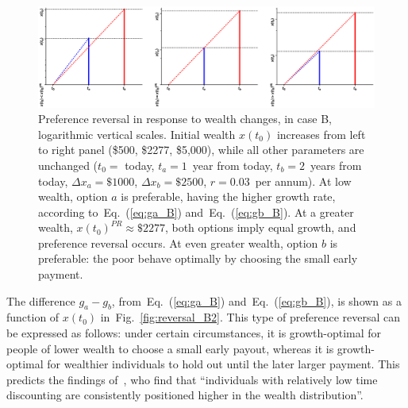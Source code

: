 \documentclass[11pt]{article}
\newcommand{\eref}[1]{Eq.~(\ref{eq:#1})}
\newcommand{\flabel}[1]{\label{fig:#1}}
\newcommand{\fref}[1]{Fig.~\ref{fig:#1}}
\newcommand{\Dx}{\Delta x}
\numberwithin{equation}{section}
\begin{document}
\begin{figure}[!htb]
\centering
\includegraphics[width=1.0\textwidth]{./figures/reversals_B.eps}
\caption{Preference reversal in response to wealth changes, in case B, logarithmic vertical scales. Initial wealth $x(t_0)$ increases from left to right panel (\$500, \$2277, \$5,000), while all other parameters are unchanged ($t_0=$ today, $t_a=1$~year from today, $t_b=2$~years from today, $\Dx_a=\$1000$, $\Dx_b=\$2500$, $r=0.03$~per annum). At low wealth, option $a$ is preferable, having the higher growth rate, according to~\eref{ga_B} and~\eref{gb_B}. At a greater wealth, $x(t_0)^{PR}\approx \$2277$, both options imply equal growth, and preference reversal occurs. At even greater wealth, option $b$ is preferable: the poor behave optimally by choosing the small early payment.}
\flabel{reversal_B}
\end{figure}


The difference $g_a-g_b$, from~\eref{ga_B} and~\eref{gb_B}, is shown as a function of $x(t_0)$ in~\fref{reversal_B2}. This type of preference reversal can be expressed as follows: under certain circumstances, it is growth-optimal for people of lower wealth to choose a small early payout, whereas it is growth-optimal for wealthier individuals to hold out until the later larger payment. This predicts the findings of~\citet{epper2018time}, who find that ``individuals with relatively low time discounting are consistently positioned higher in the wealth distribution''.
\end{document}
